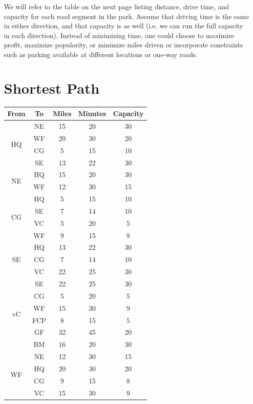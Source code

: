 We will refer to the table on the next page listing distance, drive time, and capacity for each road segment in the park. Assume that driving time is the same in either direction, and that capacity is as well (i.e. we can run the full capacity in each direction). Instead of minimizing time, one could choose to maximize profit, maximize popularity, or minimize miles driven or incorporate constraints such as parking available at different locations or one-way roads.

\section*{Shortest Path}
\begin{center}
\begin{tabular}{|c|c|c|c|c|}
\hline
From & To & Miles & Minutes & Capacity \\
\hline
\multirow[t]{4}{*}{HQ} & NE & 15 & 20 & 30 \\
\hline
 & WF & 20 & 30 & 20 \\
\hline
 & CG & 5 & 15 & 10 \\
\hline
 & SE & 13 & 22 & 30 \\
\hline
\multirow[t]{2}{*}{NE} & HQ & 15 & 20 & 30 \\
\hline
 & WF & 12 & 30 & 15 \\
\hline
\multirow[t]{4}{*}{CG} & HQ & 5 & 15 & 10 \\
\hline
 & SE & 7 & 14 & 10 \\
\hline
 & VC & 5 & 20 & 5 \\
\hline
 & WF & 9 & 15 & 8 \\
\hline
\multirow[t]{3}{*}{SE} & HQ & 13 & 22 & 30 \\
\hline
 & CG & 7 & 14 & 10 \\
\hline
 & VC & 22 & 25 & 30 \\
\hline
\multirow[t]{6}{*}{vC} & SE & 22 & 25 & 30 \\
\hline
 & CG & 5 & 20 & 5 \\
\hline
 & WF & 15 & 30 & 9 \\
\hline
 & FCP & 8 & 15 & 5 \\
\hline
 & GF & 32 & 45 & 20 \\
\hline
 & BM & 16 & 20 & 30 \\
\hline
\multirow[t]{6}{*}{WF} & NE & 12 & 30 & 15 \\
\hline
 & HQ & 20 & 30 & 20 \\
\hline
 & CG & 9 & 15 & 8 \\
\hline
 & VC & 15 & 30 & 9 \\

\end{tabular}
\end{center}
